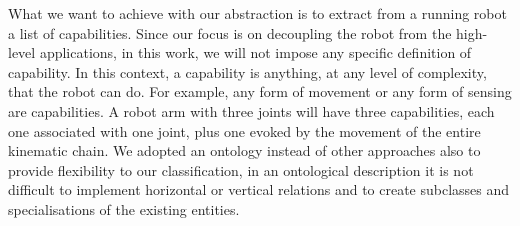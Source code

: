 What we want to achieve with our abstraction is to extract from a running robot a list of capabilities. Since our focus is on decoupling the robot from the high-level applications, in this work, we will not impose any specific definition of capability. In this context, a capability is anything, at any level of complexity, that the robot can do. For example, any form of movement or any form of sensing are capabilities. A robot arm with three joints will have three capabilities, each one associated with one joint, plus one evoked by the movement of the entire kinematic chain. We adopted an ontology instead of other approaches also to provide flexibility to our classification, in an ontological description it is not difficult to implement horizontal or vertical relations and to create subclasses and specialisations of the existing entities. 

